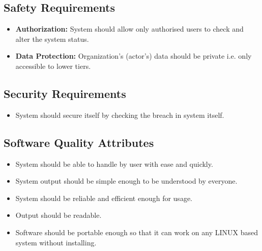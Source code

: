 \documentclass[oneside,a4paper,12pt, times]{book}
\begin{document}
\subsection{Safety Requirements}
\begin{itemize}
    \item
    \textbf{Authorization:}
        System should allow only authorised users to check and alter the system status.
    \item
    \textbf{Data Protection:}
        Organization’s (actor’s) data should be private i.e. only accessible to lower tiers.
\end{itemize}

\subsection{Security Requirements}
\begin{itemize}
    \item 
        System should secure itself by checking the breach in system itself.
\end{itemize}

\subsection{Software Quality Attributes}
\begin{itemize}
    \item
        System should be able to handle by user with ease and quickly.
    \item 
        System output should be simple enough to be understood by everyone.
    \item
        System should be reliable and efficient enough for usage.
    \item
        Output should be readable.
    \item
        Software should be portable enough so that it can work on any LINUX based system without installing.
\end{itemize}


\end{document}
